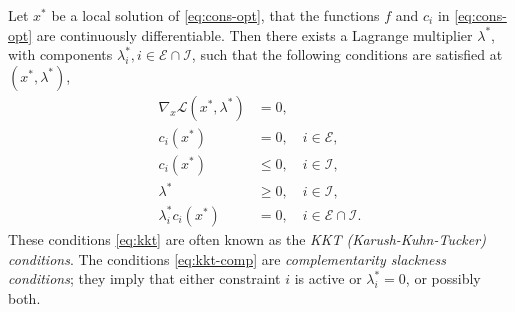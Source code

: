 \begin{definition}
    Let $x^*$ be a local solution of \eqref{eq:cons-opt}, that the functions $f$ and $c_i$ in \eqref{eq:cons-opt} are continuously differentiable. Then there exists a Lagrange multiplier $\lambda^*$, with components $\lambda_i^*, i \in \mathcal{E} \cap \mathcal{I}$, such that the following conditions are satisfied at $(x^*, \lambda^*)$,
    \begin{subequations} \label{eq:kkt}
        \begin{alignat}{4}
            \nabla_x \mathcal{L}(x^*,\lambda^*) &= 0,  \\
            c_i(x^*) &= 0, \quad i \in \mathcal{E}, \\
            c_i(x^*) &\leq 0, \quad i \in \mathcal{I}, \\
            \lambda^* & \geq 0, \quad i \in \mathcal{I}, \\
            \lambda_i^* c_i(x^*) &= 0, \quad i \in \mathcal{E} \cap \mathcal{I}. \label{eq:kkt-comp}
        \end{alignat}
    \end{subequations}
These conditions \eqref{eq:kkt} are often known as the \emph{KKT (Karush-Kuhn-Tucker) conditions}. The conditions \eqref{eq:kkt-comp} are \emph{complementarity slackness conditions}; they imply that either constraint $i$ is active or $\lambda^*_i = 0$, or possibly both.
\end{definition}

